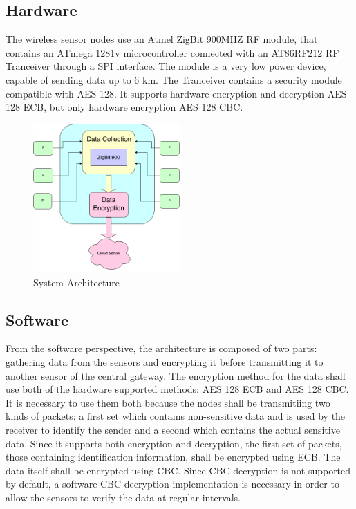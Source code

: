 \label{chap:arch}
\subsection{Hardware}

The wireless sensor nodes use an Atmel ZigBit 900MHZ RF module, that contains an ATmega 1281v microcontroller connected with an AT86RF212 RF Tranceiver through a SPI interface. The module is a very low power device, capable of sending data up to 6 km. The Tranceiver contains a security module compatible with AES-128. It supports hardware encryption and decryption AES 128 ECB, but only hardware encryption AES 128 CBC.

\begin{figure}[ht] \centering
  \includegraphics[width=0.5\textwidth]{img/wsn-soa-system-arch.png}
  \caption{System Architecture}
\end{figure}

\subsection{Software}

From the software perspective, the architecture is composed of two parts: gathering data from the sensors and encrypting it before transmitting it to another sensor of the central gateway.
The encryption method for the data shall use both of the hardware supported methods: AES 128 ECB and AES 128 CBC. It is necessary to use them both because the nodes shall be transmitiing 
two kinds of packets: a first set which contains non-sensitive data and is used by the receiver to identify the sender and a second which contains the actual sensitive data. Since it supports 
both encryption and decryption, the first set of packets, those containing identification information, shall be encrypted using ECB. The data itself shall be encrypted using CBC. Since CBC 
decryption is not supported by default, a software CBC decryption implementation is necessary in order to allow the sensors to verify the data at regular intervals.

